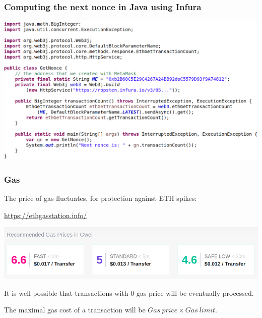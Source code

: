 \documentclass[11pt]{beamer}  %
\begin{document}
\begin{frame}\frametitle{Computing the next nonce in Java using Infura}

  \begin{center}
    \includegraphics[width=\textwidth,clip=false]{pictures/get-nonce-java.png}
  \end{center}

\end{frame}

\begin{frame}\frametitle{Gas}

  The price of gas fluctuates, for protection against ETH spikes:

  \bigskip

  \begin{greenbox}{\url{https://ethgasstation.info/}}
    \begin{center}
      \includegraphics[width=\textwidth,clip=false]{pictures/ethgasstation.png}
    \end{center}
  \end{greenbox}

  \bigskip

  It is well possible that transactions with $0$ gas price will be eventually
  processed.

  \bigskip

  The maximal gas cost of a transaction will be $\mathit{Gas\ price}\times\mathit{Gas\ limit}$.
\end{frame}
\end{document}

